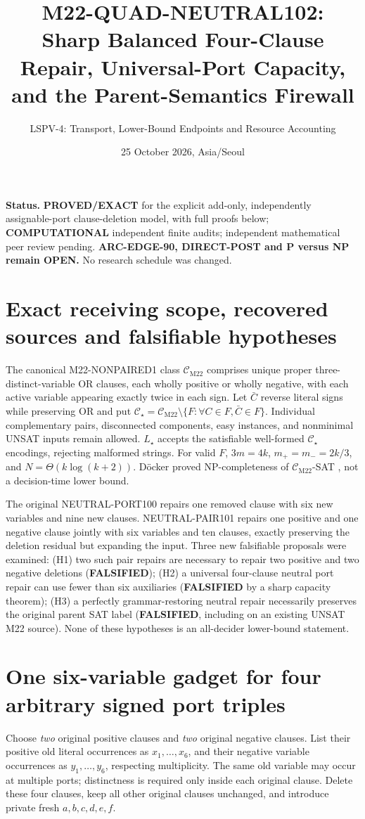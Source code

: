 \documentclass[11pt]{article}
\title{M22-QUAD-NEUTRAL102:\\ Sharp Balanced Four-Clause Repair, Universal-Port Capacity, and the Parent-Semantics Firewall}
\author{LSPV-4: Transport, Lower-Bound Endpoints and Resource Accounting}
\date{25 October 2026, Asia/Seoul}
\newcommand{\CM}{\mathcal C_{\mathrm{M22}}}
\newcommand{\CS}{\mathcal C_\star}
\begin{document}
\maketitle
\noindent\textbf{Status.} \textbf{PROVED/EXACT} for the explicit add-only, independently assignable-port clause-deletion model, with full proofs below; \textbf{COMPUTATIONAL} independent finite audits; independent mathematical peer review pending. \textbf{ARC-EDGE-90, DIRECT-POST and P versus NP remain OPEN.} No research schedule was changed.

\section{Exact receiving scope, recovered sources and falsifiable hypotheses}
The canonical M22-NONPAIRED1 class \(\CM\) comprises unique proper three-distinct-variable OR clauses, each wholly positive or wholly negative, with each active variable appearing exactly twice in each sign. Let \(\bar C\) reverse literal signs while preserving OR and put \(\CS=\CM\setminus\{F:\forall C\in F,\bar C\in F\}\). Individual complementary pairs, disconnected components, easy instances, and nonminimal UNSAT inputs remain allowed. \(L_\star\) accepts the satisfiable well-formed \(\CS\) encodings, rejecting malformed strings. For valid \(F\), \(3m=4k\), \(m_+=m_-=2k/3\), and \(N=\Theta(k\log(k+2))\). D\"ocker proved NP-completeness of \(\CM\)-SAT \cite{docker}, not a decision-time lower bound.

The original NEUTRAL-PORT100 \cite{port} repairs one removed clause with six new variables and nine new clauses. NEUTRAL-PAIR101 \cite{pair} repairs one positive and one negative clause jointly with six variables and ten clauses, exactly preserving the deletion residual but expanding the input. Three new falsifiable proposals were examined: (H1) two such pair repairs are necessary to repair two positive and two negative deletions (\textbf{FALSIFIED}); (H2) a universal four-clause neutral port repair can use fewer than six auxiliaries (\textbf{FALSIFIED} by a sharp capacity theorem); (H3) a perfectly grammar-restoring neutral repair necessarily preserves the original parent SAT label (\textbf{FALSIFIED}, including on an existing UNSAT M22 source). None of these hypotheses is an all-decider lower-bound statement.

\section{One six-variable gadget for four arbitrary signed port triples}
Choose \emph{two} original positive clauses and \emph{two} original negative clauses. List their positive old literal occurrences as \(x_1,\ldots,x_6\), and their negative variable occurrences as \(y_1,\ldots,y_6\), respecting multiplicity. The same old variable may occur at multiple ports; distinctness is required only inside each original clause. Delete these four clauses, keep all other original clauses unchanged, and introduce private fresh \(a,b,c,d,e,f\).
\end{document}
